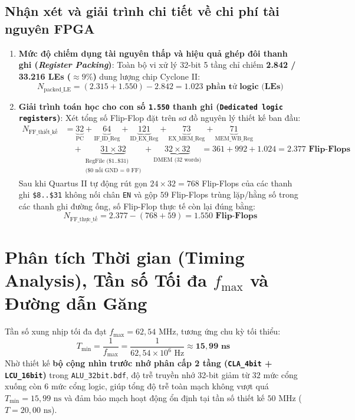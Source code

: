 \documentclass[12pt,a4paper]{report}
\begin{document}
\subsection{Nhận xét và giải trình chi tiết về chi phí tài nguyên FPGA}
\begin{enumerate}
    \item \textbf{Mức độ chiếm dụng tài nguyên thấp và hiệu quả ghép đôi thanh ghi (\textit{Register Packing})}:
    Toàn bộ vi xử lý 32-bit 5 tầng chỉ chiếm \textbf{2.842 / 33.216 LEs ($\approx 9\%$)} dung lượng chip Cyclone II:
    \begin{equation}
        N_{\text{packed\_LE}} = (2.315 + 1.550) - 2.842 = \mathbf{1.023\text{ phần tử logic (LEs)}}
    \end{equation}
    \item \textbf{Giải trình toán học cho con số \texttt{1.550} thanh ghi (\texttt{Dedicated logic registers})}:
    Xét tổng số Flip-Flop đặt trên sơ đồ nguyên lý thiết kế ban đầu:
    \begin{align}
        N_{\text{FF\_thiết\_kế}} &= \underbrace{32}_{\text{PC}} + \underbrace{64}_{\text{IF\_ID\_Reg}} + \underbrace{121}_{\text{ID\_EX\_Reg}} + \underbrace{73}_{\text{EX\_MEM\_Reg}} + \underbrace{71}_{\text{MEM\_WB\_Reg}} \nonumber \\
                                   &\quad + \underbrace{31 \times 32}_{\substack{\text{RegFile (\$1..\$31)}\\\text{(\$0 nối GND = 0 FF)}}} + \underbrace{32 \times 32}_{\text{DMEM (32 words)}} = 361 + 992 + 1.024 = \mathbf{2.377\text{ Flip-Flops}}
    \end{align}
    Sau khi Quartus II tự động rút gọn $24 \times 32 = 768$ Flip-Flops của các thanh ghi \texttt{\$8..\$31} không nối chân \texttt{EN} và gộp $59$ Flip-Flops trùng lặp/hằng số trong các thanh ghi đường ống, số Flip-Flop thực tế còn lại đúng bằng:
    \begin{equation}
        N_{\text{FF\_thực\_tế}} = 2.377 - (768 + 59) = \mathbf{1.550\text{ Flip-Flops}}
    \end{equation}
\end{enumerate}

\section{Phân tích Thời gian (Timing Analysis), Tần số Tối đa \texorpdfstring{$f_{\max}$}{fmax} và Đường dẫn Găng}
Tần số xung nhịp tối đa đạt \textbf{$f_{\max} = 62,54\text{ MHz}$}, tương ứng chu kỳ tối thiểu:
\begin{equation}
    T_{\min} = \frac{1}{f_{\max}} = \frac{1}{62,54 \times 10^6\text{ Hz}} \approx \mathbf{15,99\text{ ns}}
\end{equation}
Nhờ thiết kế \textbf{bộ cộng nhìn trước nhớ phân cấp 2 tầng (\texttt{CLA\_4bit} + \texttt{LCU\_16bit})} trong \texttt{ALU\_32bit.bdf}, độ trễ truyền nhớ 32-bit giảm từ $32$ mức cổng xuống còn $6$ mức cổng logic, giúp tổng độ trễ toàn mạch không vượt quá $T_{\min} = 15,99\text{ ns}$ và đảm bảo mạch hoạt động ổn định tại tần số thiết kế $50\text{ MHz}$ ($T = 20,00\text{ ns}$).
\end{document}
